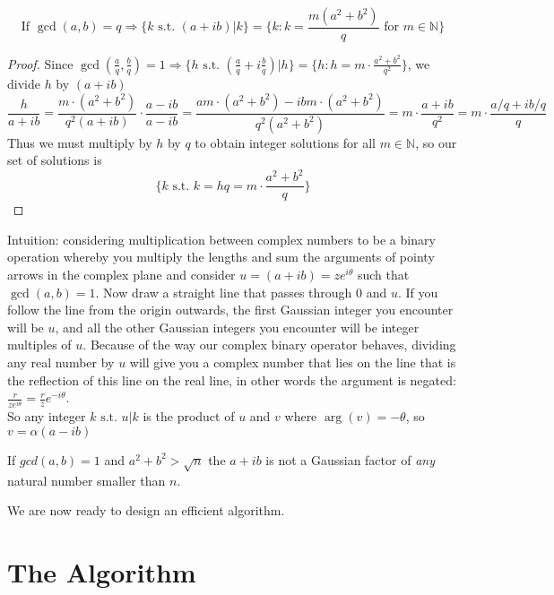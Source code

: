 \documentclass[11pt]{article}
\newcommand{\N}{\mathbb{N}}
\newcommand{\RA}{\Rightarrow}
\newcommand{\st}{\text{ s.t. }}
\newenvironment{problem}[2][\to]{\begin{trivlist}
\item[\hskip \labelsep {\bfseries #1}\hskip \labelsep {\bfseries #2.}]}{\end{trivlist}}
\begin{document}
\begin{problem}[Corollary 1]\\
    $$\text{If }\gcd(a,b) = q \RA \{k\text{ s.t. }(a+ib)|k\} = \{ k : k=\frac{m(a^2+b^2)}{q} \text{ for }m\in\N\}$$
\end{problem}
\begin{proof}
    Since $\gcd(\frac{a}{q},\frac{b}{q})=1 \RA \{h\text{ s.t. } (\frac{a}{q}+i\frac{b}{q})|h\} = 
    \{h : h=m\cdot\frac{a^2+b^2}{q^2}\}$, we divide $h$ by $(a+ib)$
    $$
    \frac{h}{a+ib} = \frac{m\cdot(a^2+b^2)}{q^2(a+ib)}\cdot\frac{a-ib}{a-ib} = \frac{am\cdot(a^2+b^2) - ibm\cdot(a^2+b^2)}{q^2(a^2+b^2)} = m\cdot\frac{a+ib}{q^2} = m\cdot\frac{a/q+ib/q}{q}
    $$
    Thus we must multiply by $h$ by $q$ to obtain integer solutions for all $m\in\N$, so our set of solutions is 
    $$
    \{ k\text{ s.t. } k=hq=m\cdot\frac{a^2+b^2}{q} \}
    $$
\end{proof}


Intuition: considering multiplication between complex numbers to be a binary operation whereby you multiply the lengths and sum the arguments of pointy arrows in the complex plane and consider $u = (a+ib) = ze^{i\theta}$ such that $\gcd(a,b)=1$. Now draw a straight line that passes through $0$ and $u$. If you follow the line from the origin outwards, the first Gaussian integer you encounter will be $u$, and all the other Gaussian integers you encounter will be integer multiples of $u$. Because of the way our complex binary operator behaves, dividing any real number by $u$ will give you a complex number that lies on the line that is the reflection of this line on the real line, in other words the argument is negated: $\frac{r}{ze^{i\theta}} = \frac{r}{z}e^{-i\theta}$.\\
So any integer $k \st u|k$ is the product of $u$ and $v$  where $\arg(v)=-\theta$, so $v = \alpha(a-ib)$\\




\begin{problem}[Corollary 2]\\
    If $gcd(a,b)=1$ and $a^2+b^2 > \sqrt{n}$ the $a+ib$ is not a Gaussian factor of \textit{any} natural number smaller than $n$.
\end{problem}

We are now ready to design an efficient algorithm.

\section{The Algorithm}
\end{document}

